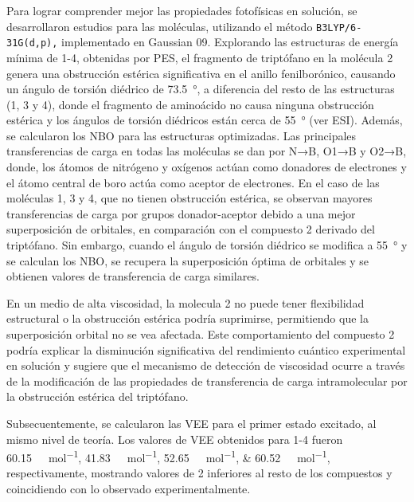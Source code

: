 Para lograr comprender mejor las propiedades fotofísicas en solución, se desarrollaron estudios \insilico{} para las moléculas, utilizando el método \texttt{B3LYP/6-31G(d,p),} implementado en Gaussian 09. Explorando las estructuras de energía mínima de 1-4, obtenidas por \gls{PES}, el fragmento de triptófano en la molécula 2 genera una obstrucción estérica significativa en el anillo fenilborónico, causando un ángulo de torsión diédrico de \qty{73.5}{\degree}, a diferencia del resto de las estructuras (1, 3 y 4), donde el fragmento de aminoácido no causa ninguna obstrucción estérica y los ángulos de torsión diédricos están cerca de \qty{55}{\degree} (ver ESI). Además, se calcularon los \gls{NBO} para las estructuras optimizadas.
Las principales transferencias de carga en todas las moléculas se dan por N→B, O1→B y O2→B, donde, los átomos de nitrógeno y oxígenos actúan como donadores de electrones y el átomo central de boro actúa como aceptor de electrones. En el caso de las moléculas 1, 3 y 4, que no tienen obstrucción estérica, se observan mayores transferencias de carga por grupos donador-aceptor debido a una mejor superposición de orbitales, en comparación con el compuesto 2 derivado del triptófano. Sin embargo, cuando el ángulo de torsión diédrico se modifica a \qty{55}{\degree} y se calculan los \gls{NBO}, se recupera la superposición óptima de orbitales y se obtienen valores de transferencia de carga similares.

En un medio de alta viscosidad, la molecula 2 no puede tener flexibilidad estructural o la obstrucción estérica podría suprimirse, permitiendo que la superposición orbital no se vea afectada. Este comportamiento del compuesto 2 podría explicar la disminución significativa del rendimiento cuántico experimental en solución y sugiere que el mecanismo de detección de viscosidad ocurre a través de la modificación de las propiedades de transferencia de carga intramolecular por la obstrucción estérica del triptófano.

Subsecuentemente, se calcularon las \gls{VEE} para el primer estado excitado, al mismo nivel de teoría. Los valores de \gls{VEE} obtenidos para 1-4 fueron \qtylist[list-units = bracket]{60.15;41.83;52.65;60.52}{\kilo\cal\per\mol}, respectivamente, mostrando valores de 2 inferiores al resto de los compuestos y coincidiendo con lo observado experimentalmente. 


